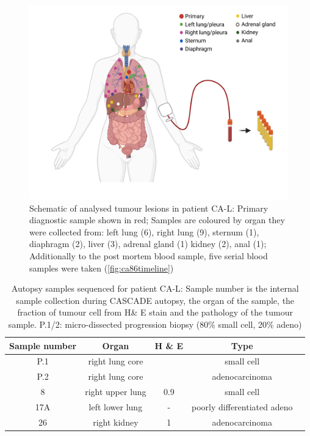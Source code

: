 \begin{figure}[ht]
\centering
\includegraphics[width=.99\linewidth]{Figures/CASCADE/CA86/CA-L_schematic_CA86_organColours}
\caption[Schematic of analysed tumour lesions in patient CA-L]{Schematic of analysed tumour lesions in patient CA-L: Primary diagnostic sample shown in red; Samples are coloured by organ they were collected from: left lung (6), right lung (9), sternum (1), diaphragm (2), liver (3), adrenal gland (1) kidney (2), anal (1); Additionally to the post mortem blood sample, five serial blood samples were taken (\protect\autoref{fig:ca86timeline})} \label{fig:ca86schematic}
\end{figure}

\begin{table}[ht]
\caption[Autopsy samples sequenced for patient CA-L]{Autopsy samples sequenced for patient CA-L: Sample number is the internal sample collection during CASCADE autopsy, the organ of the sample, the fraction of tumour cell from H\& E stain and the pathology of the tumour sample. P.1/2: micro-dissected progression biopsy (80\% small cell, 20\% adeno)}\label{tab:ca86wesSamples}
\centering
{}
\begin{tabular}{|c|c|c|c|c|}
\toprule
\hline
 \rowcolor{gray!50}
\textbf{Sample number} & \textbf{Organ} & \textbf{H \& E} & \textbf{Type}\\
\hline
 P.1 & right lung core & \cellcolor{gray!15} & small cell \\
 P.2 & right lung core & \cellcolor{gray!15}\multirow{-2}{*}{>0.9} & adenocarcinoma \\
 8 & right upper lung & 0.9 & small cell \\
 17A & left lower lung & - & poorly differentiated adeno \\
 26 & right kidney & 1 & adenocarcinoma \\
 \hline
\bottomrule
\end{tabular}
\end{table} 

